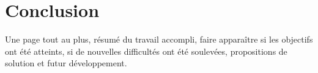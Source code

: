\section*{Conclusion}

Une page tout au plus, résumé du travail accompli, faire apparaître si les objectifs ont été atteints, si de nouvelles difficultés ont été soulevées, propositions de solution et futur développement.
